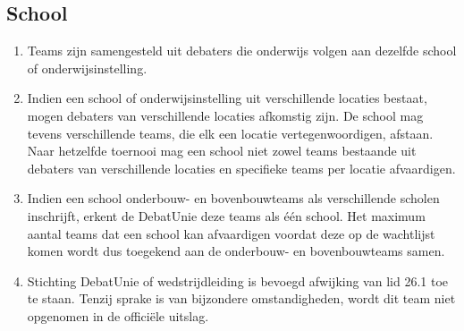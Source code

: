 \subsection{School}

\begin{enumerate}
\item Teams zijn samengesteld uit debaters die onderwijs volgen aan dezelfde school of onderwijsinstelling. 
\item Indien een school of onderwijsinstelling uit verschillende locaties bestaat, mogen debaters van verschillende locaties afkomstig zijn. De school mag tevens verschillende teams, die elk een locatie vertegenwoordigen, afstaan. Naar hetzelfde toernooi mag een school niet zowel teams bestaande uit debaters van verschillende locaties en specifieke teams per locatie afvaardigen.
\item Indien een school onderbouw- en bovenbouwteams als verschillende scholen inschrijft, erkent de DebatUnie deze teams als één school. Het maximum aantal teams dat een school kan afvaardigen voordat deze op de wachtlijst komen wordt dus toegekend aan de onderbouw- en bovenbouwteams samen. 
\item Stichting DebatUnie of wedstrijdleiding is bevoegd afwijking van lid 26.1 toe te staan. Tenzij sprake is van bijzondere omstandigheden, wordt dit team niet opgenomen in de officiële uitslag.
\end{enumerate}
